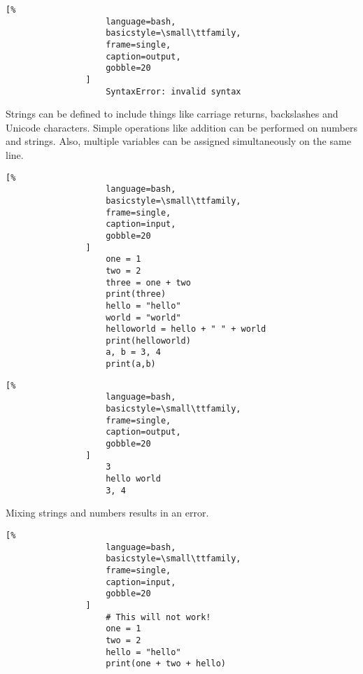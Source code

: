\documentclass[crop=false,class=article,oneside]{standalone}
\begin{document}
            \begin{minipage}[t]{.48\textwidth}
                \centering
                \begin{lstlisting}[%
                    language=bash,
                    basicstyle=\small\ttfamily,
                    frame=single,
                    caption=output,
                    gobble=20
                ]
                    SyntaxError: invalid syntax
                \end{lstlisting}
            \end{minipage}
            Strings can be defined to include things like
            carriage returns, backslashes and Unicode characters.
            Simple operations like addition can be performed on
            numbers and strings. Also, multiple variables can be
            assigned simultaneously on the same line.\newline
            \begin{minipage}[t]{.48\textwidth}
                \centering
                \begin{lstlisting}[%
                    language=bash,
                    basicstyle=\small\ttfamily,
                    frame=single,
                    caption=input,
                    gobble=20
                ]
                    one = 1
                    two = 2
                    three = one + two
                    print(three)
                    hello = "hello"
                    world = "world"
                    helloworld = hello + " " + world
                    print(helloworld)
                    a, b = 3, 4
                    print(a,b)
                \end{lstlisting}
            \end{minipage}
            \hfill
            \begin{minipage}[t]{.48\textwidth}
                \centering
                \begin{lstlisting}[%
                    language=bash,
                    basicstyle=\small\ttfamily,
                    frame=single,
                    caption=output,
                    gobble=20
                ]
                    3
                    hello world
                    3, 4
                \end{lstlisting}
            \end{minipage}
            Mixing strings and numbers results in
            an error.\newline
            \begin{minipage}[t]{.48\textwidth}
                \centering
                \begin{lstlisting}[%
                    language=bash,
                    basicstyle=\small\ttfamily,
                    frame=single,
                    caption=input,
                    gobble=20
                ]
                    # This will not work!
                    one = 1
                    two = 2
                    hello = "hello"
                    print(one + two + hello)
                \end{lstlisting}
            \end{minipage}\hfill
\end{document}
